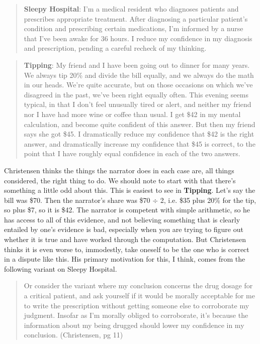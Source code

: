 \begin{quote} \textbf{Sleepy Hospital}: I'm a medical resident who diagnoses patients and prescribes appropriate treatment.  After diagnosing a particular patient's condition and prescribing certain medications, I'm informed by a nurse that I've been awake for 36 hours.  I reduce my confidence in my diagnosis and prescription, pending a careful recheck of my thinking. \end{quote}

\begin{quote} \textbf{Tipping}: My friend and I have been going out to dinner for many years.  We always tip 20\% and divide the bill equally, and we always do the math in our heads.  We're quite accurate, but on those occasions on which we've disagreed in the past, we've been right equally often. This evening seems typical, in that I don't feel unusually tired or alert, and neither my friend nor I have had more wine or coffee than usual.  I get \$42 in my mental calculation, and become quite confident of this answer.  But then my friend says she got \$45. I dramatically reduce my confidence that \$42 is the right answer, and dramatically increase my confidence that \$45 is correct, to the point that I have roughly equal confidence in each of the two answers.  \end{quote}

\noindent Christensen thinks the things the narrator does in each case are, all things considered, the right thing to do. We should note to start with that there's something a little odd about this. This is easiest to see in \textbf{Tipping}. Let's say the bill was \$70. Then the narrator's share was \$70 $\div$ 2, i.e. \$35 plus 20\% for the tip, so plus \$7, so it is \$42. The narrator is competent with simple arithmetic, so he has access to all of this evidence, and not believing something that is clearly entailed by one's evidence is bad, especially when you are trying to figure out whether it is true and have worked through the computation. But Christensen thinks it is even worse to, immodestly, take oneself to be the one who is correct in a dispute like this. His primary motivation for this, I think, comes from the following variant on Sleepy Hospital.

\begin{quote}Or consider the variant where my conclusion concerns the drug dosage for a critical patient, and ask yourself if it would be morally acceptable for me to write the prescription without getting someone else to corroborate my judgment.  Insofar as I'm morally obliged to corroborate, it's because the information about my being drugged should lower my confidence in my conclusion. (Christensen, pg 11) \end{quote}

